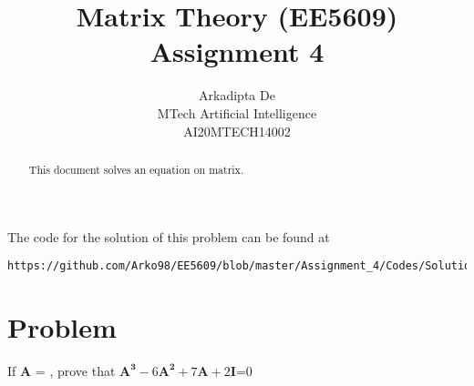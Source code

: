 \documentclass[journal,12pt,twocolumn]{IEEEtran}
\begin{document}
\makeatletter
{}
\makeatother
\let\StandardTheFigure\thefigure
\let\vec\mathbf
\renewcommand{\thefigure}{\theproblem}
\def\putbox#1#2#3{\makebox[0in][l]{\makebox[#1][l]{}\raisebox{\baselineskip}[0in][0in]{\raisebox{#2}[0in][0in]{#3}}}}
     \def\rightbox#1{\makebox[0in][r]{#1}}
     \def\centbox#1{\makebox[0in]{#1}}
     \def\topbox#1{\raisebox{-\baselineskip}[0in][0in]{#1}}
     \def\midbox#1{\raisebox{-0.5\baselineskip}[0in][0in]{#1}}
\vspace{3cm}
\title{Matrix Theory (EE5609) Assignment 4}
\author{Arkadipta De\\MTech Artificial Intelligence\\AI20MTECH14002}

\maketitle
\newpage
\bigskip
\renewcommand{\thefigure}{\theenumi}
\renewcommand{\thetable}{\theenumi}

\begin{abstract}
This document solves an equation on matrix.
\end{abstract}
The code for the solution of this problem can be found at
%
\begin{lstlisting}
https://github.com/Arko98/EE5609/blob/master/Assignment_4/Codes/Solution.py
\end{lstlisting}
%
\section{Problem}
If $\vec{A}$ = , prove that $\vec{A^3}-6\vec{A^2}+7\vec{A}+2\vec{I}$=0
\end{document}
